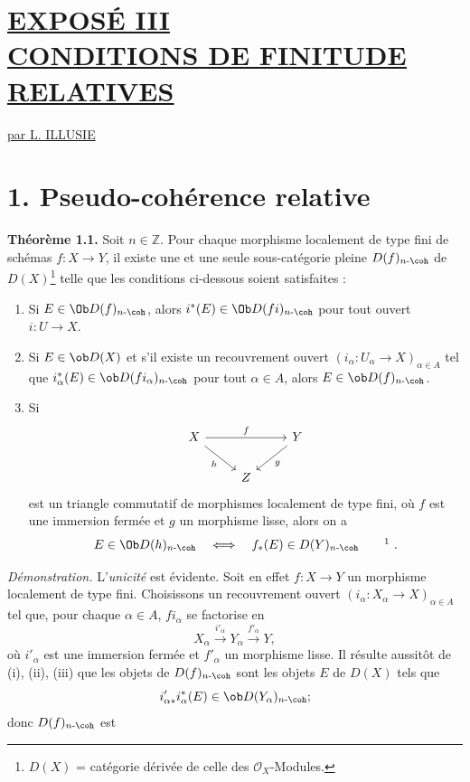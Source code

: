 \section*{\underline{EXPOSÉ III}\\[3pt] \underline{\underline{CONDITIONS DE FINITUDE RELATIVES}}}
\begin{center}
\underline{par L. ILLUSIE}
\end{center}

\section*{1. Pseudo-cohérence relative}

\textbf{Théorème 1.1.} Soit \(n\in\mathbb Z\). Pour chaque morphisme localement de type fini de schémas \(f:X\longrightarrow Y\), il existe une et une seule sous-catégorie pleine \(D(f)_{n\text{-}\coh}\) de \(D(X)\)\footnote{\(D(X)\) = catégorie dérivée de celle des \(\mathcal O_X\)-Modules.} telle que les conditions ci-dessous soient satisfaites :
\begin{enumerate}[label=(\roman*)]
\item Si \(E\in\Ob D(f)_{n\text{-}\coh}\), alors \(i^*(E)\in\Ob D(fi)_{n\text{-}\coh}\) pour tout ouvert \(i:U\to X\).

\item Si \(E\in\ob D(X)\) et s'il existe un recouvrement ouvert \((i_\alpha:U_\alpha\to X)_{\alpha\in A}\) tel que \(i_\alpha^*(E)\in\ob D(fi_\alpha)_{n\text{-}\coh}\) pour tout \(\alpha\in A\), alors \(E\in\ob D(f)_{n\text{-}\coh}\).

\item Si
\[
\begin{tikzcd}
X \arrow[rr,"f"] \arrow[dr,"h"'] & & Y \arrow[dl,"g"]\\
& Z &
\end{tikzcd}
\]
est un triangle commutatif de morphismes localement de type fini, où \(f\) est une immersion fermée et \(g\) un morphisme lisse, alors on a
\[
  E\in\Ob D(h)_{n\text{-}\coh}
  \quad\Longleftrightarrow\quad
  f_*(E)\in D(Y)_{n\text{-}\coh}\qquad\mbox{\footnotemark}\ .
\]
\end{enumerate}

\emph{Démonstration.} L'\emph{unicité} est évidente. Soit en effet \(f:X\to Y\) un morphisme localement de type fini. Choisissons un recouvrement ouvert \((i_\alpha:X_\alpha\to X)_{\alpha\in A}\) tel que, pour chaque \(\alpha\in A\), \(fi_\alpha\) se factorise en
\[
  X_\alpha\xrightarrow{i'_\alpha}Y_\alpha\xrightarrow{f'_\alpha}Y,
\]
où \(i'_\alpha\) est une immersion fermée et \(f'_\alpha\) un morphisme lisse. Il résulte aussitôt de (i), (ii), (iii) que les objets de \(D(f)_{n\text{-}\coh}\) sont les objets \(E\) de \(D(X)\) tels que
\[
  i'_{\alpha *}i_\alpha^*(E)\in \ob D(Y_\alpha)_{n\text{-}\coh};
\]
donc \(D(f)_{n\text{-}\coh}\) est
